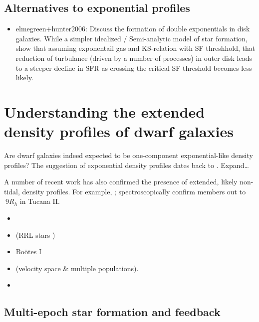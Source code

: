 \subsection{Alternatives to exponential
profiles}\label{alternatives-to-exponential-profiles}

\begin{itemize}
\tightlist
\item
  elmegreen+hunter2006: Discuss the formation of double exponentials in
  disk galaxies. While a simpler idealized / Semi-analytic model of star
  formation, show that assuming exponentail gas and KS-relation with SF
  threshhold, that reduction of turbulance (driven by a number of
  processes) in outer disk leads to a steeper decline in SFR as crossing
  the critical SF threshold becomes less likely.
\end{itemize}

\section{Understanding the extended density profiles of dwarf
galaxies}\label{understanding-the-extended-density-profiles-of-dwarf-galaxies}

Are dwarf galaxies indeed expected to be one-component exponential-like
density profiles? The suggestion of exponential density profiles dates
back to \citet{faber+lin1983}. Expand\ldots{}

A number of recent work has also confirmed the presence of extended,
likely non-tidal, density profiles. For example, \citet{chiti+2021};
\citet{chiti+2023} spectroscopically confirm members out to \(~9 R_h\)
in Tucana II.

\begin{itemize}
\tightlist
\item
  \citet{revaz+jablonka2018}
\item
  \citet{tau+vivas+martinez-vazquez2024} (RRL stars )
\item
  \citet{roderick+2016} Boötes I
\item
  \citet{mcconnachie+penarrubia+navarro2007} (velocity space \& multiple
  populations).
\item
  \citet{cicuendez+battaglia2018}
\end{itemize}

\subsection{Multi-epoch star formation and
feedback}\label{multi-epoch-star-formation-and-feedback}

